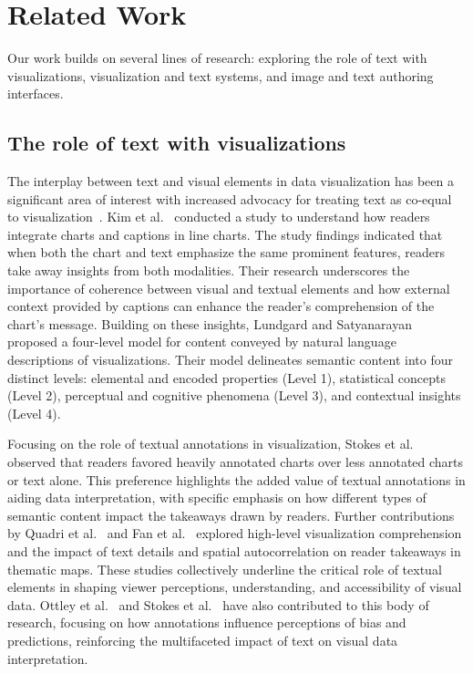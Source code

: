 \section{Related Work}
Our work builds on several lines of research: exploring the role of text with visualizations, visualization and text systems, and image and text authoring interfaces.

\subsection{The role of text with visualizations}
The interplay between text and visual elements in data visualization has been a significant area of interest with increased advocacy for treating text as co-equal to visualization~\cite{stokesgive, lundgard2021accessible}. Kim et al.~\cite{kim2021towards} conducted a study to understand how readers integrate charts and captions in line charts. The study findings indicated that when both the chart and text emphasize the same prominent features, readers take away insights from both modalities. Their research underscores the importance of coherence between visual and textual elements and how external context provided by captions can enhance the reader's comprehension of the chart's message. Building on these insights, Lundgard and Satyanarayan~\cite{lundgard2021accessible} proposed a four-level model for content conveyed by natural language descriptions of visualizations. Their model delineates semantic content into four distinct levels: elemental and encoded properties (Level 1), statistical concepts (Level 2), perceptual and cognitive phenomena (Level 3), and contextual insights (Level 4).

Focusing on the role of textual annotations in visualization, Stokes et al.~\cite{stokes2022striking} observed that readers favored heavily annotated charts over less annotated charts or text alone. This preference highlights the added value of textual annotations in aiding data interpretation, with specific emphasis on how different types of semantic content impact the takeaways drawn by readers. Further contributions by Quadri et al.~\cite{quadri2024you} and Fan et al.~\cite{fan2024understanding} explored high-level visualization comprehension and the impact of text details and spatial autocorrelation on reader takeaways in thematic maps. These studies collectively underline the critical role of textual elements in shaping viewer perceptions, understanding, and accessibility of visual data. Ottley et al.~\cite{ottley2019curious} and Stokes et al.~\cite{stokes2023role} have also contributed to this body of research, focusing on how annotations influence perceptions of bias and predictions, reinforcing the multifaceted impact of text on visual data interpretation.

